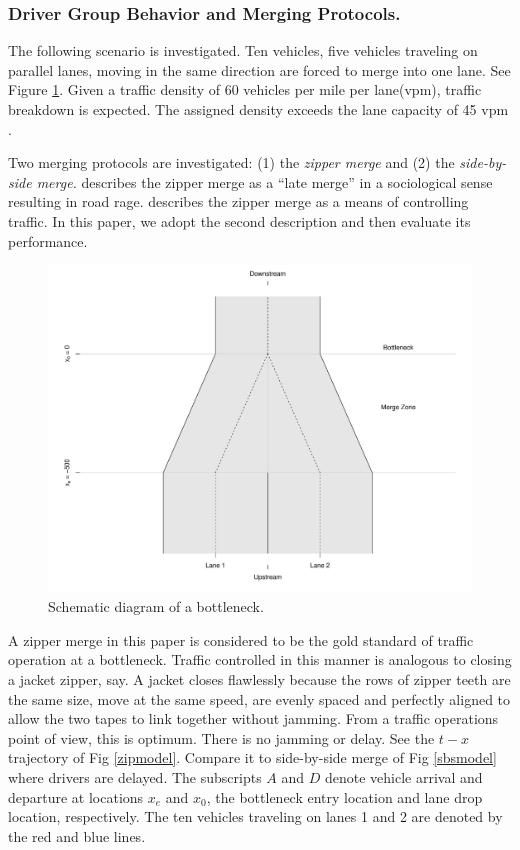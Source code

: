 \documentclass[Proceedings]{ascelike}
\begin{document}
\subsubsection{Driver Group Behavior and Merging Protocols.} 

The following scenario is investigated. Ten vehicles, five vehicles traveling on  parallel lanes, moving in the same direction are forced to merge into one lane. See Figure \ref{schematic}. Given a traffic density of 60 vehicles per mile per lane(vpm), traffic breakdown is expected.  The assigned density exceeds the lane capacity of 45 vpm \cite{HCM2000}. 


Two merging protocols are investigated: (1) the \emph{zipper merge} and (2) the \emph{side-by-side merge.}  describes the  zipper merge as a ``late merge'' in a sociological sense resulting in road rage.  describes the zipper merge as a means of controlling traffic. In this paper, we adopt the second description and then evaluate its performance. 


\begin{figure}
\centering
\includegraphics[width = 7in]{Rplot02.pdf}
\caption{Schematic diagram of a bottleneck.}
\label{schematic}
\end{figure}

A zipper merge in this paper is considered to be the gold standard of traffic operation at a bottleneck.  Traffic controlled  in this manner is analogous to  closing a jacket zipper, say. A jacket closes flawlessly because the rows of zipper teeth are the same size, move at the same speed, are evenly spaced and perfectly aligned to allow the two tapes to link together without jamming. From a traffic operations point of view, this is optimum. There is no jamming or delay. See the $t-x$ trajectory of Fig \ref{zipmodel}. Compare it to side-by-side merge of Fig \ref{sbsmodel} where drivers are delayed. The subscripts $A$ and $D$ denote  vehicle arrival and departure at locations $x_e$ and $x_0$, the bottleneck entry location and lane drop location, respectively. The ten vehicles traveling on lanes 1 and 2 are denoted by the red and blue lines. 
\end{document}
